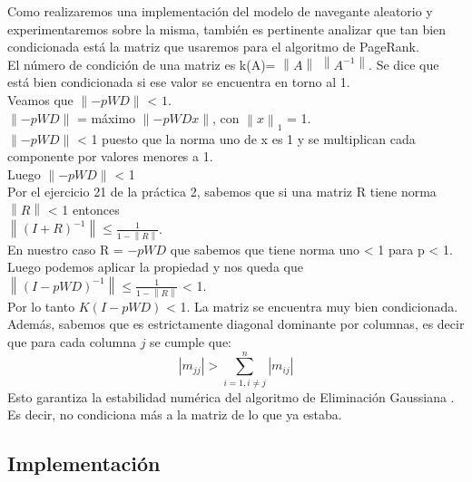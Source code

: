Como realizaremos una implementación del modelo de navegante aleatorio y experimentaremos sobre la misma, también es pertinente analizar que tan bien condicionada está la matriz que usaremos para el algoritmo de PageRank. \\

El número de condición de una matriz es k(A)= $\left\lVert A \right\rVert$ $\left\lVert A^{-1} \right\rVert$. Se dice que está bien condicionada si ese valor se encuentra en torno al 1.\\

Veamos que $\left\lVert -pWD \right\rVert$  < $1$. \\
$\left\lVert -pWD \right\rVert$ = máximo $\left\lVert -pWDx \right\rVert$, con 
 $\left\lVert x \right\rVert _{1}$ = 1. \\
  $\left\lVert -pWD \right\rVert$ < 1 puesto que la norma uno de x es 1 y se multiplican cada componente por valores menores a 1. \\
 Luego $\left\lVert -pWD \right\rVert$ < 1  \\

Por el ejercicio 21 de la práctica 2, sabemos que si una matriz R tiene norma $\left\lVert R \right\rVert$ < 1 entonces\\ $ \left\lVert (I+R)^{-1} \right\rVert \leq \frac{1}{1- \left\lVert R \right\rVert}$. \\
En nuestro caso R = $-pWD$ que sabemos que tiene norma uno < 1 para p < 1. \\
Luego podemos aplicar la propiedad y nos queda que $ \left\lVert (I-pWD)^{-1} \right\rVert \leq \frac{1}{1- \left\lVert R \right\rVert}$ < 1. \\

Por lo tanto $K(I-pWD)$ < 1. La matriz se encuentra muy bien condicionada. \\

Además, sabemos que es estrictamente diagonal dominante por columnas, es decir que para cada columna $j$ se cumple que:
\begin{equation}
    |m_{jj}| > \sum_{i=1,i \neq j}^n |m_{ij}|
\end{equation}
Esto garantiza la estabilidad numérica del algoritmo de Eliminación Gaussiana \cite{burden}. Es decir, no condiciona más a la matriz de lo que ya estaba. \\

\subsection{Implementación}

